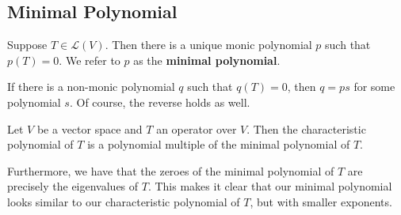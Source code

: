 \documentclass{memoir}
\begin{document}
\subsection{Minimal Polynomial}
\label{subsec:minimal_polynomial}

\begin{defn}
	Suppose \(T \in \mathcal{L}(V)\). Then there is a unique monic polynomial \(p\) such that \(p(T) = 0\). We refer to \(p\) as the \textbf{minimal polynomial}.
\end{defn}
If there is a non-monic polynomial \(q\) such that \(q(T)=0\), then \(q = ps\) for some polynomial \(s\). Of course, the reverse holds as well.

\begin{prop}
	Let \(V\) be a vector space and \(T\) an operator over \(V\). Then the characteristic polynomial of \(T\) is a polynomial multiple of the minimal polynomial of \(T\).
\end{prop}
Furthermore, we have that the zeroes of the minimal polynomial of \(T\) are precisely the eigenvalues of \(T\). This makes it clear that our minimal polynomial looks similar to our characteristic polynomial of \(T\), but with smaller exponents.

\end{document}
